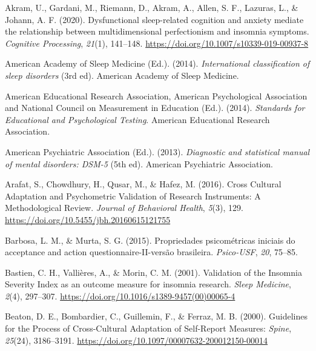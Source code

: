 \documentclass[
  ,doc,11pt, twoside,floatsintext]{apa6}
\newlength{\cslhangindent}
\newlength{\cslentryspacingunit} %
\newenvironment{CSLReferences}[2] %
 {%
  \setlength{\parindent}{0pt}
  \ifodd #1
  \let\oldpar\par
  \def\par{\hangindent=\cslhangindent\oldpar}
  \fi
  \setlength{\parskip}{#2\cslentryspacingunit}
 }%
 {}
\begin{document}
\setlength{\parindent}{-0.5in}
\setlength{\leftskip}{0.5in}

\hypertarget{refs}{}
\begin{CSLReferences}{1}{0}
\leavevmode{}%
Akram, U., Gardani, M., Riemann, D., Akram, A., Allen, S. F., Lazuras, L., \& Johann, A. F. (2020). Dysfunctional sleep-related cognition and anxiety mediate the relationship between multidimensional perfectionism and insomnia symptoms. \emph{Cognitive Processing}, \emph{21}(1), 141--148. \url{https://doi.org/10.1007/s10339-019-00937-8}

\leavevmode{}%
American Academy of Sleep Medicine (Ed.). (2014). \emph{International classification of sleep disorders} (3rd ed). {American Academy of Sleep Medicine}.

\leavevmode{}%
American Educational Research Association, American Psychological Association and National Council on Measurement in Education (Ed.). (2014). \emph{Standards for {Educational} and {Psychological Testing}}. {American Educational Research Association}.

\leavevmode{}%
American Psychiatric Association (Ed.). (2013). \emph{Diagnostic and statistical manual of mental disorders: {DSM}-5} (5th ed). {American Psychiatric Association}.

\leavevmode{}%
Arafat, S., Chowdhury, H., Qusar, M., \& Hafez, M. (2016). Cross {Cultural Adaptation} and {Psychometric Validation} of {Research Instruments}: A {Methodological Review}. \emph{Journal of Behavioral Health}, \emph{5}(3), 129. \url{https://doi.org/10.5455/jbh.20160615121755}

\leavevmode{}%
Barbosa, L. M., \& Murta, S. G. (2015). Propriedades psicométricas iniciais do acceptance and action questionnaire-II-versão brasileira. \emph{Psico-USF}, \emph{20}, 75--85.

\leavevmode{}%
Bastien, C. H., Vallières, A., \& Morin, C. M. (2001). Validation of the {Insomnia Severity Index} as an outcome measure for insomnia research. \emph{Sleep Medicine}, \emph{2}(4), 297--307. \url{https://doi.org/10.1016/s1389-9457(00)00065-4}

\leavevmode{}%
Beaton, D. E., Bombardier, C., Guillemin, F., \& Ferraz, M. B. (2000). Guidelines for the {Process} of {Cross-Cultural Adaptation} of {Self-Report Measures}: \emph{Spine}, \emph{25}(24), 3186--3191. \url{https://doi.org/10.1097/00007632-200012150-00014}


\end{CSLReferences}
\end{document}
